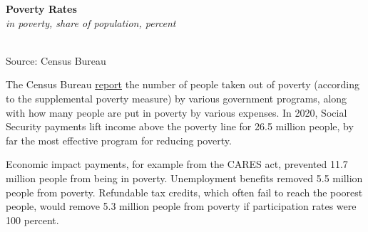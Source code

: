 \documentclass{report}
\makeatletter
\newcommand{\tbllink}[1]{\href{https://raw.githubusercontent.com/bdecon/US-chartbook/master/chartbook/data/#1}{\faTable}}
\newcommand*\short[1]{\expandafter\@gobbletwo\number\numexpr#1\relax}
\newcommand{\absnode}[3]{\node[below right, align=left] at (axis cs: #1,#2) {#3};}
\newcommand{\dateaxisticks}{
		date coordinates in=x, axis line style={draw=none},
		xmax={2022-03-15},
		max space between ticks=40,	    
		xtick={{1990-01-01}, {1992-01-01}, {1994-01-01}, 
			{1996-01-01}, {1998-01-01}, {2000-01-01}, 
			{2002-01-01}, {2004-01-01}, {2006-01-01},
			{2008-01-01}, {2010-01-01}, {2012-01-01}, {2014-01-01},
		    {2016-01-01}, {2018-01-01}, {2020-01-01}, {2022-01-01}, 
		    {2024-01-01}, {2026-01-01}},
		minor xtick={{1989-01-01}, {1991-01-01}, {1993-01-01},
			{1995-01-01}, {1997-01-01}, {1999-01-01}, 
			{2001-01-01}, {2003-01-01}, {2005-01-01}, {2007-01-01},
		    {2009-01-01}, {2011-01-01}, {2013-01-01}, {2015-01-01},
		    {2017-01-01}, {2019-01-01}, {2021-01-01}, {2023-01-01}, 
		    {2025-01-01}, {2027-01-01}},
		enlarge y limits={0.06}, enlarge x limits={0.01},
		}
\newcommand{\bbar}[2]{extra #1 ticks = {{#2}}, extra #1 tick labels = ,
		extra #1 tick style = {grid=major, grid style={thick, black!25}},}
\newcommand{\thickline}[4]{\addplot[ultra thick, no markers, color=#1] 
		table [x=#2, y=#3, col sep=comma] {#4};	}
\newcommand{\rbars}{
		\fill[color=black!10] (axis cs:{1990-07-01},\pgfkeysvalueof{/pgfplots/ymin}) rectangle 
			(axis cs:{1991-03-01}, \pgfkeysvalueof{/pgfplots/ymax});
		\fill[color=black!10] (axis cs:{2007-12-01},\pgfkeysvalueof{/pgfplots/ymin}) rectangle 
			(axis cs:{2009-07-01}, \pgfkeysvalueof{/pgfplots/ymax});
		\fill[color=black!10] (axis cs:{2001-03-01},\pgfkeysvalueof{/pgfplots/ymin}) rectangle 
			(axis cs:{2001-11-01}, \pgfkeysvalueof{/pgfplots/ymax});
		\fill[color=black!10] (axis cs:{2020-02-01},\pgfkeysvalueof{/pgfplots/ymin}) rectangle 
			(axis cs:{2020-05-01}, \pgfkeysvalueof{/pgfplots/ymax});}
\makeatother
\begin{document}
{\begin{minipage}{0.76\textwidth}
\small 
\vspace{1mm}

\normalsize \textbf{Poverty Rates}\\
\footnotesize{\textit{in poverty, share of population, percent}}\\
\hspace*{-2mm} \\
\footnotesize{Source: Census Bureau} \hfill \tbllink{poverty_opm_line.csv}
\end{minipage}
\newpage
\begin{minipage}{0.76\textwidth}
\small The Census Bureau \href{https://www.census.gov/library/publications/2021/demo/p60-275.html}{report} the number of people taken out of poverty (according to the supplemental poverty measure) by various government programs, along with how many people are put in poverty by various expenses. In 2020, Social Security payments lift income above the poverty line for 26.5 million people, by far the most effective program for reducing poverty.

Economic impact payments, for example from the CARES act, prevented 11.7 million people from being in poverty. Unemployment benefits removed 5.5 million people from poverty. Refundable tax credits, which often fail to reach the poorest people, would remove 5.3 million people from poverty if participation rates were 100 percent. 


\end{minipage}}
\end{document}
